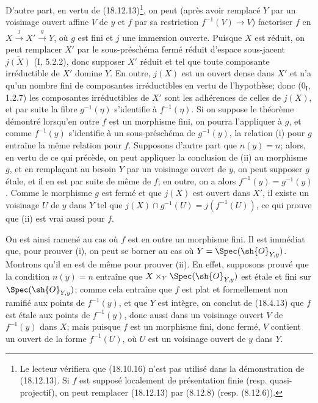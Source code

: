 
D'autre part, en vertu de (18.12.13)\footnote{Le lecteur vérifiera que (18.10.16) n'est pas utilisé dans la démonstration de (18.12.13). Si $f$ est supposé localement de présentation finie (resp. quasi-projectif), on peut remplacer (18.12.13) par (8.12.8) (resp. (8.12.6)).}, on peut (après avoir remplacé $Y$ par un voisinage ouvert affine $V$ de $y$ et $f$ par sa restriction $f^{-1}(V)\to V$) factoriser $f$ en $X\xrightarrow{j}X'\xrightarrow{g}Y$, où $g$ est fini et $j$ une immersion ouverte. Puisque $X$ est réduit, on peut remplacer $X'$ par le sous-préschéma fermé réduit d'espace sous-jacent $\overline{j(X)}$ (I, 5.2.2), donc supposer $X'$ réduit et tel que toute composante irréductible de $X'$ domine $Y$. En outre, $j(X)$ est un ouvert dense dans $X'$ et n'a qu'un nombre fini de composantes irréductibles en vertu de l'hypothèse; donc ($0_{\mathrm I}$, 1.2.7) les composantes irréductibles de $X'$ sont les adhérences de celles de $j(X)$, et par suite la fibre $g^{-1}(\eta)$ s'identifie à $f^{-1}(\eta)$. Si on suppose le théorème démontré lorsqu'en outre $f$ est un morphisme fini, on pourra l'appliquer à $g$, et comme $f^{-1}(y)$ s'identifie à un sous-préschéma de $g^{-1}(y)$, la relation (i) pour $g$ entraîne la même relation pour $f$. Supposons d'autre part que $n(y)=n$; alors, en vertu de ce qui précède, on peut appliquer la conclusion de (ii) au morphisme $g$, et en remplaçant au besoin $Y$ par un voisinage ouvert de $y$, on peut supposer $g$ étale, et il en est par suite de même de $f$; en outre, on a alors $f^{-1}(y)=g^{-1}(y)$. Comme le morphisme $g$ est fermé et que $j(X)$ est ouvert dans $X'$, il existe un voisinage $U$ de $y$ dans $Y$ tel que $j(X)\cap g^{-1}(U)=j(f^{-1}(U))$, ce qui prouve que (ii) est vrai aussi pour $f$.

On est ainsi ramené au cas où $f$ est en outre un morphisme fini. Il est immédiat que, pour prouver (i), on peut se borner au cas où $Y=\Spec(\sh{O}_{Y,y})$. Montrons qu'il en est de même pour prouver (ii). En effet, supposons prouvé que la condition $n(y)=n$ entraîne que $X\times_Y\Spec(\sh{O}_{Y,y})$ est étale et fini sur $\Spec(\sh{O}_{Y,y})$; comme cela entraîne que $f$ est plat et formellement non ramifié aux points de $f^{-1}(y)$, et que $Y$ est intègre, on conclut de (18.4.13) que $f$ est étale aux points de $f^{-1}(y)$, donc aussi dans un voisinage ouvert $V$ de $f^{-1}(y)$ dans $X$; mais puisque $f$ est un morphisme fini, donc fermé, $V$ contient un ouvert de la forme $f^{-1}(U)$, où $U$ est un voisinage ouvert de $y$ dans $Y$.

